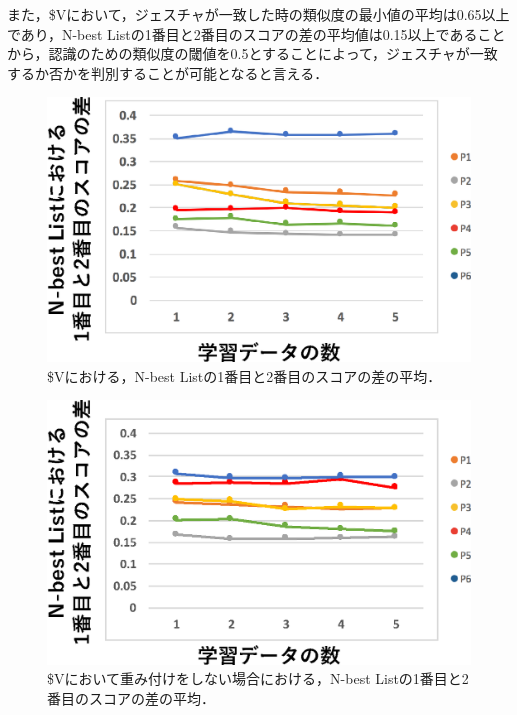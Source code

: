 また，\$Vにおいて，ジェスチャが一致した時の類似度の最小値の平均は0.65以上であり，N-best Listの1番目と2番目のスコアの差の平均値は0.15以上であることから，認識のための類似度の閾値を0.5とすることによって，ジェスチャが一致するか否かを判別することが可能となると言える．
\begin{figure}[!h]
\centering
\includegraphics[width=0.7\columnwidth]{img/rec_diff.eps}
\caption{\$Vにおける，N-best Listの1番目と2番目のスコアの差の平均．}
\label{fig:rec_diff}
\end{figure}

\begin{figure}[!h]
\centering
\includegraphics[width=0.7\columnwidth]{img/rec_diff_10.eps}
\caption{\$Vにおいて重み付けをしない場合における，N-best Listの1番目と2番目のスコアの差の平均．}
\label{fig:rec_diff_10}
\end{figure}

